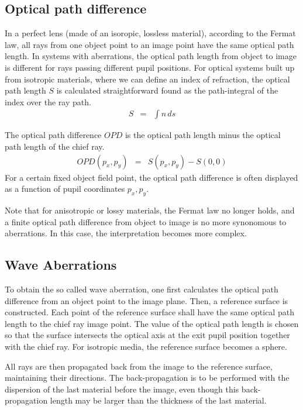 \documentclass[12pt,a4paper,twoside,openright,BCOR10mm,headsepline,titlepage,abstracton,chapterprefix,final]{scrreprt}
\begin{document}
\subsection{Optical path difference}
In a perfect lens (made of an isoropic, lossless material), according to the Fermat law, all rays from one object point to an image point have the same optical path length. 
In systems with aberrations, the optical path length from object to image is different for rays passing different pupil positions.
For optical systems built up from isotropic materials, where we can define an index of refraction, the optical path length $S$ is calculated straightforward found as the path-integral of the index over the ray path.
\begin{eqnarray}
 S &=& \int n\, ds
\end{eqnarray}

The optical path difference $OPD$ is the optical path length minus the optical path length of the chief ray.
\begin{eqnarray}
 OPD(p_x,p_y) &=& S(p_x,p_y) - S(0,0)
\end{eqnarray}
For a certain fixed object field point, the optical path difference is often displayed as a function of pupil coordinates $p_x,p_y$.

Note that for anisotropic or lossy materials, the Fermat law no longer holds, and a finite optical path difference from object to image is no more synonomous to aberrations.
In this case, the interpretation becomes more complex.

\subsection{Wave Aberrations}
To obtain the so called wave aberration, one first calculates the optical path difference from an object point to the image plane.
Then, a reference surface is constructed. 
Each point of the reference surface shall have the same optical path length to the chief ray image point.
The value of the optical path length is chosen so that the surface intersects the optical axis at the exit pupil position together with the chief ray.
For isotropic media, the reference surface becomes a sphere.

All rays are then propagated back from the image to the reference surface, maintaining their directions.
The back-propagation is to be performed with the dispersion of the last material before the image, even though this back-propagation length may be larger than the thickness of the last material.
\end{document}
